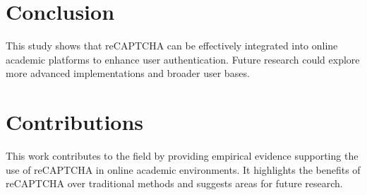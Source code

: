 \documentclass{article}
\begin{document}
\section{Conclusion}
This study shows that reCAPTCHA can be effectively integrated into online academic platforms to enhance user authentication. Future research could explore more advanced implementations and broader user bases.

\section{Contributions}
This work contributes to the field by providing empirical evidence supporting the use of reCAPTCHA in online academic environments. It highlights the benefits of reCAPTCHA over traditional methods and suggests areas for future research.



\end{document}
